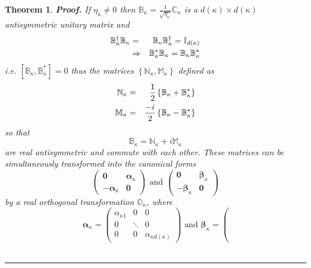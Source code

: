 \documentclass[aps,preprint]{revtex4}
\newtheorem{theorem}{Theorem}
\newenvironment{proof}[1][Proof]{\noindent\textbf{#1.} }{\ \rule{0.5em}{0.5em}}
\begin{document}
\begin{theorem}
\begin{proof}
If $\eta _{\kappa }\neq 0$ then $\mathbb{B}_{\kappa }=\frac{1}{\sqrt{\eta
_{\kappa }}}\mathbb{C}_{\kappa }$ is a $d\left( \kappa \right) \times
d\left( \kappa \right) $ antisymmetric unitary matrix and 
\begin{eqnarray}
\mathbb{B}_{\kappa }^{\dagger }\mathbb{B}_{\kappa } &=&\mathbb{B}_{\kappa }%
\mathbb{B}_{\kappa }^{\dagger }=\mathbb{I}_{d\left( \kappa \right) }  \notag
\\
&\Rightarrow &\mathbb{B}_{\kappa }^{\ast }\mathbb{B}_{\kappa }=\mathbb{B}%
_{\kappa }\mathbb{B}_{\kappa }^{\ast }
\end{eqnarray}%
i.e. $\left[ \mathbb{B}_{\kappa },\mathbb{B}_{\kappa }^{\ast }\right] =0$
thus the matrices $\left\{ \mathbb{N}_{\kappa },\mathbb{M}_{\kappa }\right\} 
$ defined as 
\begin{eqnarray}
\mathbb{N}_{\kappa } &=&\frac{1}{2}\left\{ \mathbb{B}_{\kappa }+\mathbb{B}%
_{\kappa }^{\ast }\right\}  \notag \\
\mathbb{M}_{\kappa } &=&\frac{-i}{2}\left\{ \mathbb{B}_{\kappa }-\mathbb{B}%
_{\kappa }^{\ast }\right\}
\end{eqnarray}%
so that 
\begin{equation}
\mathbb{B}_{\kappa }=\mathbb{N}_{\kappa }+i\mathbb{M}_{\kappa }
\end{equation}%
are real antisymmetric and \emph{commute }with each other. These matrices
can be simultaneously transformed into the canonical forms 
\begin{equation}
\left( 
\begin{array}{cc}
\mathbf{0} & \mathbf{\alpha }_{\kappa } \\ 
-\mathbf{\alpha }_{\kappa } & \mathbf{0}%
\end{array}%
\right) \text{ and }\left( 
\begin{array}{cc}
\mathbf{0} & \mathbf{\beta }_{\kappa } \\ 
-\mathbf{\beta }_{\kappa } & \mathbf{0}%
\end{array}%
\right)
\end{equation}%
by a real orthogonal transformation $\mathbb{O}_{\kappa }$, where 
\begin{equation}
\mathbf{\alpha }_{\kappa }=\left( 
\begin{array}{ccc}
\alpha _{\kappa 1} & 0 & 0 \\ 
0 & \ddots & 0 \\ 
0 & 0 & \alpha _{\kappa d\left( \kappa \right) }%
\end{array}%
\right) \text{ and }\mathbf{\beta }_{\kappa }=\left( 

\end{equation}
\end{proof}
\end{theorem}
\end{document}
